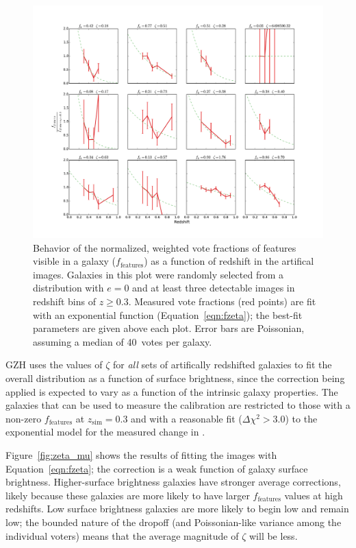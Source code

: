 \documentclass[twocolumn]{aastex6}
\begin{document}
\begin{figure}
\center
\includegraphics[width=\textwidth]{figures/zeta_examples.pdf}
\caption{Behavior of the normalized, weighted vote fractions of features visible in a galaxy ($f_\textrm{features}$) as a function of redshift in the artifical \ferengi{} images. Galaxies in this plot were randomly selected from a distribution with $e=0$ and at least three detectable images in redshift bins of $z\ge0.3$. Measured vote fractions (red points) are fit with an exponential function (Equation~\ref{eqn:fzeta}); the best-fit parameters are given above each plot. Error bars are Poissonian, assuming a median of 40~votes per galaxy.}
\label{fig:zeta_examples}
\end{figure}

GZH uses the values of $\zeta$ for \emph{all} sets of artifically redshifted galaxies to fit the overall distribution as a function of surface brightness, since the correction being applied is expected to vary as a function of the intrinsic galaxy properties. The galaxies that can be used to measure the calibration are restricted to those with a non-zero $f_\textrm{features}$ at $z_\mathrm{sim}=0.3$ and with a reasonable fit ($\Delta \chi^2 > 3.0$) to the exponential model for the measured change in \ffeatures. 

Figure~\ref{fig:zeta_mu} shows the results of fitting the \ferengi{} images with Equation~\ref{eqn:fzeta}; the correction is a weak function of galaxy surface brightness. Higher-surface brightness galaxies have stronger average corrections, likely because these galaxies are more likely to have larger $f_\textrm{features}$ values at high redshifts. Low surface brightness galaxies are more likely to begin low and remain low; the bounded nature of the dropoff (and Poissonian-like variance among the individual voters) means that the average magnitude of $\zeta$ will be less. 
\end{document}
